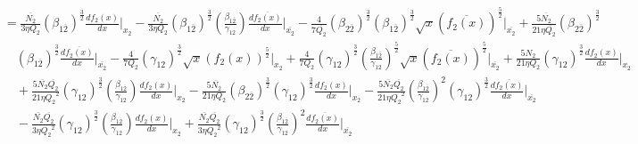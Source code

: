 \documentclass[fleqn, 10pt]{article}
\begin{document}
            \begin{equation}
            \begin{split}
            &=  \frac{\overline{N_2}}{3 \eta Q_2} (\beta_{1\overline{2}})^\frac{3}{2} \frac{df_2(x)}{dx} \Bigg|_{x_2} -   \frac{\overline{N_2}}{3 \eta Q_2} (\beta_{1\overline{2}})^\frac{3}{2} \left(\frac{\beta_{1\overline{2}}}{\gamma_{12}}\right) \frac{d\overline{f_2(x)}}{dx} \Bigg|_{\overline{x_2}} -   \frac{4}{7 \overline{Q_2}} (\beta_{2\overline{2}})^\frac{3}{2} (\beta_{1\overline{2}})^\frac{3}{2} \sqrt{x} (\overline{f_2(x)})^\frac{5}{2} \Bigg|_{\overline{x_2}} +   \frac{5 \overline{N_2}}{21 \eta \overline{Q_2}} (\beta_{2\overline{2}})^\frac{3}{2}  \\ & \quad (\beta_{1\overline{2}})^\frac{3}{2} \frac{d\overline{f_2(x)}}{dx} \Bigg|_{\overline{x_2}} -  \frac{4}{7 Q_2} (\gamma_{12})^\frac{3}{2} \sqrt{x} (f_2(x))^\frac{5}{2} \Bigg|_{x_2} +   \frac{4}{7Q_2} (\gamma_{12})^\frac{3}{2} \left(\frac{\beta_{1\overline{2}}}{\gamma_{12}}\right)^\frac{5}{2} \sqrt{x} (\overline{f_2(x)})^\frac{5}{2} \Bigg|_{\overline{x_2}} +  \frac{5 N_2}{21 \eta Q_2} (\gamma_{12})^\frac{3}{2} \frac{df_2(x)}{dx} \Bigg|_{x_2} \\ & \quad +   \frac{5 \overline{N_2} \overline{Q_2}}{21 \eta {Q_2}^2} (\gamma_{12})^\frac{3}{2} \left(\frac{\beta_{1\overline{2}}}{\gamma_{12}}\right) \frac{df_2(x)}{dx} \Bigg|_{x_2}  -  \frac{5 \overline{N_2}}{21 \eta Q_2} (\beta_{2\overline{2}})^\frac{3}{2} (\gamma_{12})^\frac{3}{2} \frac{df_2(x)}{dx} \Bigg|_{x_2} -   \frac{5 \overline{N_2} \overline{Q_2}}{21 \eta {Q_2}^2} \left(\frac{\beta_{1\overline{2}}}{\gamma_{12}}\right)^2 (\gamma_{12})^\frac{3}{2} \frac{d\overline{f_2(x)}}{dx} \Bigg|_{\overline{x_2}}  \\ & \quad -   \frac{\overline{N_2} \overline{Q_2}}{3 \eta {Q_2}^2} (\gamma_{12})^\frac{3}{2} \left(\frac{\beta_{1\overline{2}}}{\gamma_{12}}\right) \frac{df_2(x)}{dx} \Bigg|_{x_2} +  \frac{\overline{N_2} \overline{Q_2}}{3 \eta {Q_2}^2} (\gamma_{12})^\frac{3}{2} \left(\frac{\beta_{1\overline{2}}}{\gamma_{12}}\right)^2 \frac{d\overline{f_2(x)}}{dx} \Bigg|_{\overline{x_2}}
            \end{split}
            \end{equation}
\end{document}
